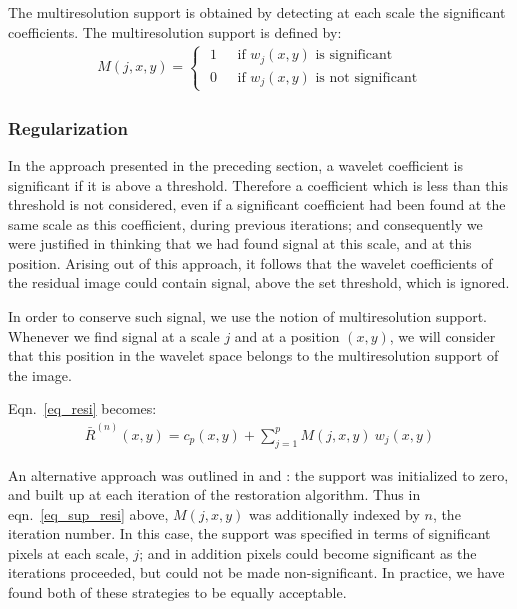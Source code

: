The multiresolution support is obtained by detecting 
at each scale the significant coefficients.  The multiresolution support is 
defined by:
\begin{eqnarray}
M(j,x,y) = \left\{
  \begin{array}{ll}
  \mbox{ 1 } & \mbox{ if }   w_j(x,y) \mbox{ is significant} \\
  \mbox{ 0 } & \mbox{ if }  w_j(x,y) \mbox{ is not significant}
  \end{array}
  \right.
\end{eqnarray}

  
\subsubsection{Regularization}

In the approach presented in the preceding section, 
a wavelet coefficient is significant
if it is above a threshold.  Therefore a coefficient which is 
less than this threshold is not considered, even if a significant 
coefficient had
been found at the same scale as this coefficient, during previous 
iterations; and consequently we were justified in thinking that we had found
signal at this scale, and at this position.  Arising out of this approach,
it follows that the wavelet coefficients of the residual image could
contain signal, above the set threshold, which is ignored.  
 
In order to 
conserve such signal, we use the notion of multiresolution support.
Whenever we find signal at a scale $j$ and at a position $(x,y)$, we will 
consider that this position in the wavelet space belongs to the 
multiresolution support of the image.
 
Eqn.\ \ref{eq_resi} becomes:
\begin{eqnarray}
\bar{R}^{(n)}(x,y) = c_{p}(x,y) + \sum_{j=1}^{p} M(j,x,y) \  w_j(x,y)
\label{eq_sup_resi}
\end{eqnarray}
 
An alternative approach was outlined in \cite{starck:mur95_2} and 
\cite{starck:sta95_1}:
 the support was
initialized to zero, and built up at each iteration of the restoration 
algorithm.  Thus in eqn.\ \ref{eq_sup_resi} above, 
$M(j,x,y)$ was additionally
indexed by $n$, the iteration number.  In this case, the support was
specified in terms of significant pixels at each scale, $j$; and in addition
pixels could become significant as the iterations proceeded, but could not
be made non-significant.  In practice, we have found both of these strategies
to be equally acceptable.

